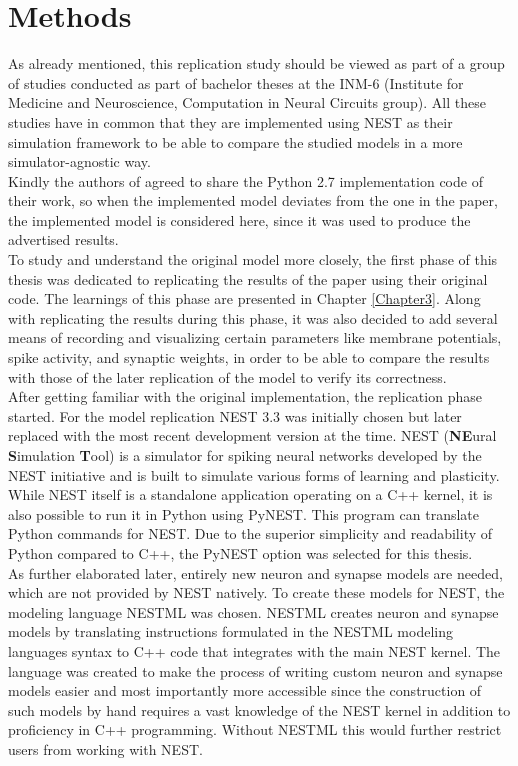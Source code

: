 \section{Methods} \label{sec:methods}
As already mentioned, this replication study should be viewed as part of a group of studies conducted as part of bachelor theses at the INM-6 (Institute for Medicine and Neuroscience, Computation in Neural Circuits group). All these studies have in common that they are implemented using NEST \parencite{nest_3_3} as their simulation framework to be able to compare the studied models in a more simulator-agnostic way.\\
Kindly the authors of \parencite{klampfl_maass_2013} agreed to share the Python 2.7 implementation code of their work, so when the implemented model deviates from the one in the paper, the implemented model is considered here, since it was used to produce the advertised results.\\
To study and understand the original model more closely, the first phase of this thesis was dedicated to replicating the results of the paper using their original code. The learnings of this phase are presented in Chapter \ref{Chapter3}. Along with replicating the results during this phase, it was also decided to add several means of recording and visualizing certain parameters like membrane potentials, spike activity, and synaptic weights, in order to be able to compare the results with those of the later replication of the model to verify its correctness.\\
After getting familiar with the original implementation, the replication phase started. For the model replication NEST 3.3 \parencite{nest_3_3} was initially chosen but later replaced with the most recent development version at the time. 
NEST (\textbf{NE}ural \textbf{S}imulation \textbf{T}ool) is a simulator for spiking neural networks developed by the NEST initiative and is built to simulate various forms of learning and plasticity. While NEST itself is a standalone application operating on a C++ kernel, it is also possible to run it in Python using PyNEST. This program can translate Python commands for NEST. Due to the superior simplicity and readability of Python compared to C++, the PyNEST option was selected for this thesis.\\
As further elaborated later, entirely new neuron and synapse models are needed, which are not provided by NEST natively. To create these models for NEST, the modeling language NESTML \parencite{nestml_5_0_0} was chosen. NESTML creates neuron and synapse models by translating instructions formulated in the NESTML modeling languages syntax to C++ code that integrates with the main NEST kernel. The language was created to make the process of writing custom neuron and synapse models easier and most importantly more accessible since the construction of such models by hand requires a vast knowledge of the NEST kernel in addition to proficiency in C++ programming. Without NESTML this would further restrict users from working with NEST.\\
